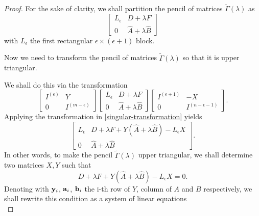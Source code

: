 \begin{cs}
\begin{proof}
        For the sake of clarity, we shall partition the pencil of matrices \(\tilde{\Gamma}(\lambda)\) as
        \[
            \begin{bmatrix}
                L_{\epsilon} & D + \lambda F \\
                0 & \widehat{A} + \lambda \widehat{B}
            \end{bmatrix}
        \]
        with \(L_{\epsilon}\) the first rectangular \(\epsilon \times (\epsilon + 1)\) block.

        Now we need to transform the pencil of matrices \(\tilde{\Gamma}(\lambda)\) so that it is upper triangular.

        We shall do this via the transformation
        \begin{equation} \label{singular-transformation}
            \begin{bmatrix}
                I^{(\epsilon)} & Y \\
                0 & I^{(m - \epsilon)}
            \end{bmatrix}
            \begin{bmatrix}
                L_{\epsilon} & D + \lambda F \\
                0 & \widehat{A} + \lambda \widehat{B}
            \end{bmatrix}
            \begin{bmatrix}
                I^{(\epsilon + 1)} & -X \\
                0 & I^{(n - \epsilon - 1)}
            \end{bmatrix}.
        \end{equation}
        Applying the transformation in \eqref{singular-transformation} yields
        \[
            \begin{bmatrix}
                L_{\epsilon} & D + \lambda F + Y(\widehat{A} + \lambda \widehat{B}) - L_{\epsilon}X \\
                0 & \widehat{A} + \lambda \widehat{B}
            \end{bmatrix}.
        \]
        In other words, to make the pencil \(\tilde{\Gamma}(\lambda)\) upper triangular, we shall determine
        two matrices \(X, Y\) such that
        \[
            D + \lambda F + Y(\widehat{A} + \lambda \widehat{B}) - L_{\epsilon}X = 0.
        \]
        Denoting with \(\vb{y}_{i}\), \(\vb{a}_{i}\), \(\vb{b}_{i}\) the i-th row of \(Y\), column of \(A\) and
        \(B\) respectively,
        we shall rewrite this condition as a system of linear equations
        \begin{equation} \label{linear-system-x}

\end{equation}
\end{proof}
\end{cs}
